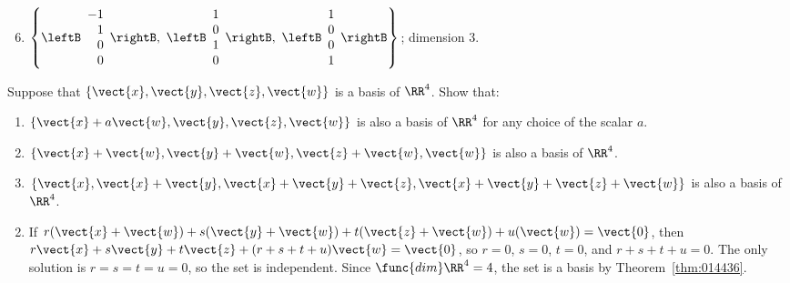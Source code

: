 \begin{multicols}{2}
\begin{ex}
\begin{sol}
\begin{enumerate}[label={\alph*.}]
\setcounter{enumi}{5}
\item  
$\left \{
\leftB \begin{array}{r}
	-1 \\
	1 \\
	0 \\
	0
\end{array} \rightB
,\
\leftB \begin{array}{r}
	1 \\
	0 \\
	1 \\
	0
\end{array} \rightB
,\
\leftB \begin{array}{r}
	1 \\
	0 \\
	0 \\
	1
\end{array} \rightB
\right \}
$; dimension $3$.

\end{enumerate}
\end{sol}
\end{ex}

\begin{ex}
Suppose that $\{\vect{x}, \vect{y}, \vect{z}, \vect{w}\}$ is a basis of $\RR^4$. Show that:

\begin{enumerate}[label={\alph*.}]
\item $\{\vect{x} + a\vect{w}, \vect{y}, \vect{z}, \vect{w}\}$ is also a basis of $\RR^4$ for any choice of the scalar $a$.

\item $\{\vect{x} + \vect{w}, \vect{y} + \vect{w}, \vect{z} + \vect{w}, \vect{w}\}$ is also a basis of $\RR^4$.

\item $\{\vect{x}, \vect{x} + \vect{y}, \vect{x} + \vect{y} + \vect{z}, \vect{x} + \vect{y} + \vect{z} + \vect{w}\}$ is also a basis of $\RR^4$.

\end{enumerate}
\begin{sol}
\begin{enumerate}[label={\alph*.}]
\setcounter{enumi}{1}
\item  If $r(\vect{x} + \vect{w}) + s(\vect{y} + \vect{w}) + t(\vect{z} + \vect{w}) + u(\vect{w}) = \vect{0}$, then $r\vect{x} + s\vect{y} + t\vect{z} + (r + s + t + u)\vect{w} = \vect{0}$, so $r = 0$, $s = 0$, $t = 0$, and $r + s + t + u = 0$. The only solution is $r = s = t = u = 0$, so the set is independent. Since $\func{dim} \RR^4 = 4$, the set is a basis by Theorem~\ref{thm:014436}.


\end{enumerate}
\end{sol}
\end{ex}
\end{multicols}
